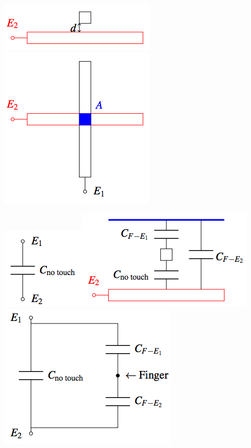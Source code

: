 \documentclass{article}\usepackage{amsmath,amssymb,amsthm,tikz,tkz-graph,color,chngpage,soul,hyperref,csquotes,graphicx,floatrow}\newcommand*{\QEDB}{\hfill\ensuremath{\square}}\newtheorem*{prop}{Proposition}\renewcommand{\theenumi}{\alph{enumi}}\usepackage[shortlabels]{enumitem}\usepackage[nobreak=true]{mdframed}\usetikzlibrary{matrix,calc}\MakeOuterQuote{"}\usepackage[margin=0.75in]{geometry} \newtheorem{theorem}{Theorem}
\begin{document}
\begin{center}\includegraphics{2d1}\includegraphics{2d2}\end{center}
\begin{center}\includegraphics{cnt}\includegraphics{ct}\includegraphics{ctcd}\end{center}
\end{document}
